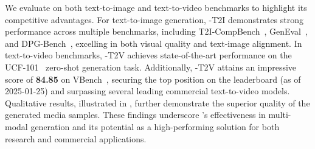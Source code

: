 We evaluate \ours on both text-to-image and text-to-video benchmarks to highlight its competitive advantages. For text-to-image generation, \ours-T2I demonstrates strong performance across multiple benchmarks, including T2I-CompBench~\citep{huang2023t2i-compbench}, GenEval~\citep{ghosh2024geneval}, and DPG-Bench~\citep{hu2024ella_dbgbench}, excelling in both visual quality and text-image alignment. In text-to-video benchmarks, \ours-T2V achieves state-of-the-art performance on the UCF-101~\citep{ucf101} zero-shot generation task. Additionally, \ours-T2V attains an impressive score of \textbf{84.85} on VBench~\citep{huang2024vbench}, securing the top position on the leaderboard (as of 2025-01-25) and surpassing several leading commercial text-to-video models. Qualitative results, illustrated in , further demonstrate the superior quality of the generated media samples. These findings underscore \ours's effectiveness in multi-modal generation and its potential as a high-performing solution for both research and commercial applications.